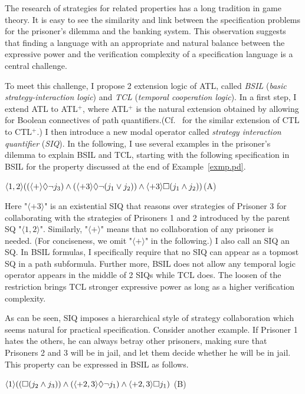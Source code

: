 The research of strategies for related properties has a long tradition in game theory.  
It is easy to see the similarity and link between the specification problems for the prisoner's dilemma and the banking system.
This observation suggests that finding a language with an appropriate and natural balance between the expressive power and the verification complexity of a specification language is a central challenge.

To meet this challenge, I propose 2 extension logic of ATL, called {\em BSIL} ({\em basic strategy-interaction logic}) and {\em TCL} ({\em temporal cooperation logic}).
In a first step, I extend ATL to ATL$^+$, where ATL$^+$ is the natural extension obtained by allowing for Boolean connectives of path quantifiers.(Cf.~\cite{BPM83,EC80} for the similar extension of CTL to CTL$^+$.)
I then introduce a new modal operator called {\em strategy interaction quantifier} ({\em SIQ}). 
In the following, I use several examples in the prisoner's dilemma to explain BSIL and TCL, starting with the following specification in BSIL for the property discussed at the end of Example~\ref{exmp.pd}.
\begin{center} 
\hfill $\langle 1,2\rangle((\langle+\rangle\Diamond\neg j_3)\wedge 
	(\langle +3\rangle \Diamond\neg (j_1\vee j_2))
	\wedge \langle+3\rangle \Box (j_1\wedge j_2))
$\hfill (A) 
\end{center} 
Here "$\langle+3\rangle$" is an existential SIQ that reasons over 
strategies of Prisoner 3 for collaborating with the strategies  
of Prisoners 1 and 2 introduced by the parent SQ "$\langle 1,2\rangle$". 
Similarly, "$\langle+\rangle$" means that no collaboration of any prisoner is needed. 
(For conciseness, we omit "$\langle+\rangle$" in the following.)
I also call an SIQ an SQ.  
In BSIL formulas, I specifically require that no SIQ can appear as a topmost SQ in a path subformula.
Further more, BSIL does not allow any temporal logic operator appears in the middle of 2 SIQs while TCL does.
The loosen of the restriction brings TCL stronger expressive power as long as a higher verification complexity.

As can be seen, SIQ imposes a hierarchical style of strategy collaboration which seems natural for practical specification.  
Consider another example.
If Prisoner 1 hates the others, he can always betray other prisoners, making sure that Prisoners 2 and 3 will be in jail, and let them decide whether he will be in jail.  
This property can be expressed in BSIL as follows. 
\begin{center} 
\hfill 
$\langle 1\rangle((\Box (j_2\wedge j_3))\wedge 
	(\langle +2,3\rangle \Diamond\neg j_1)
	\wedge \langle+2,3\rangle \Box j_1)
$
\hfill (B) 
\end{center} 

